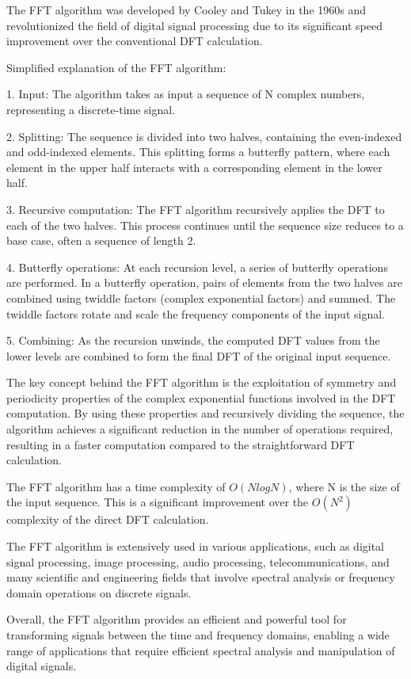 The FFT algorithm was developed by Cooley and Tukey in the 1960s and revolutionized the field of digital signal processing due to its significant speed improvement over the conventional DFT calculation.

Simplified explanation of the FFT algorithm:

1. Input: The algorithm takes as input a sequence of N complex numbers, representing a discrete-time signal.

2. Splitting: The sequence is divided into two halves, containing the even-indexed and odd-indexed elements. This splitting forms a butterfly pattern, where each element in the upper half interacts with a corresponding element in the lower half.

3. Recursive computation: The FFT algorithm recursively applies the DFT to each of the two halves. This process continues until the sequence size reduces to a base case, often a sequence of length 2.

4. Butterfly operations: At each recursion level, a series of butterfly operations are performed. In a butterfly operation, pairs of elements from the two halves are combined using twiddle factors (complex exponential factors) and summed. The twiddle factors rotate and scale the frequency components of the input signal.

5. Combining: As the recursion unwinds, the computed DFT values from the lower levels are combined to form the final DFT of the original input sequence.

The key concept behind the FFT algorithm is the exploitation of symmetry and periodicity properties of the complex exponential functions involved in the DFT computation. By using these properties and recursively dividing the sequence, the algorithm achieves a significant reduction in the number of operations required, resulting in a faster computation compared to the straightforward DFT calculation.

The FFT algorithm has a time complexity of $O(N log N)$, where N is the size of the input sequence. This is a significant improvement over the $O(N^2)$ complexity of the direct DFT calculation.

The FFT algorithm is extensively used in various applications, such as digital signal processing, image processing, audio processing, telecommunications, and many scientific and engineering fields that involve spectral analysis or frequency domain operations on discrete signals.

Overall, the FFT algorithm provides an efficient and powerful tool for transforming signals between the time and frequency domains, enabling a wide range of applications that require efficient spectral analysis and manipulation of digital signals.

